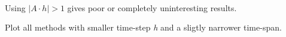 \documentclass[11pt]{article}
\begin{document}
    \begin{center}
    \end{center}
    { \hspace*{\fill} \\}
    
    \begin{center}
    \end{center}
    { \hspace*{\fill} \\}
    
    \begin{center}
    \end{center}
    { \hspace*{\fill} \\}
    
    \begin{center}
    \end{center}
    { \hspace*{\fill} \\}
    
    \begin{center}
    \end{center}
    { \hspace*{\fill} \\}
    
    \begin{center}
    \end{center}
    { \hspace*{\fill} \\}
    
    Using \(|A\cdot h | > 1\) gives poor or completely uninteresting
results.

    Plot all methods with smaller time-step \emph{h} and a sligtly narrower
time-span.
\end{document}
